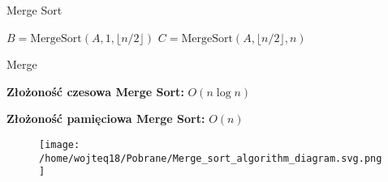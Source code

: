 \documentclass{article}
\begin{document}
\begin{algorithm}[H]
    \caption{Merge Sort}\label{alg:merge_sort}
    \begin{algorithmic}[1]
            \State {}
        \Else
            \State $B = \text{MergeSort}(A, 1, \lfloor n/2 \rfloor)$
            \State $C = \text{MergeSort}(A, \lfloor n/2 \rfloor, n)$
            \State {}
        \EndIf
    \EndProcedure
    \end{algorithmic}    
\end{algorithm}
\begin{algorithm}[H]
    \caption{Merge}\label{alg:merge}
    \begin{algorithmic}[1]
            \State {}
            \State {}
            \State {}   
        \Else
            \State {}
        \EndIf
    \EndProcedure
    \end{algorithmic}       
\end{algorithm}
\vspace{1\baselineskip}
\textbf{Złożoność czesowa Merge Sort:} $O(n \log n)$ \par
\textbf{Złożoność pamięciowa Merge Sort:} $O(n)$
\vspace{2\baselineskip}
\begin{figure}[H]
    \centering
    \texttt{[image: /home/wojteq18/Pobrane/Merge\_sort\_algorithm\_diagram.svg.png]}
    \label{fig:example_image}
\end{figure}
\end{document}
